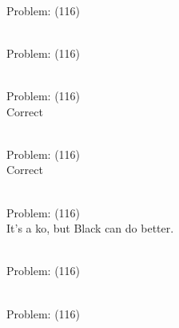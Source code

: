 \documentclass[11pt]{article}
\begin{document}
\begin{minipage}[t]{0.5\textwidth}
  {\centering
  
\\
Problem: (116)\\
  }
\end{minipage}
\begin{minipage}[t]{0.5\textwidth}
  {\centering
  
\\
Problem: (116)\\
  }
\end{minipage}
\begin{minipage}[t]{0.5\textwidth}
  {\centering
  
\\
Problem: (116)\\
Correct\\
  }
\end{minipage}
\begin{minipage}[t]{0.5\textwidth}
  {\centering
  
\\
Problem: (116)\\
Correct\\
  }
\end{minipage}
\begin{minipage}[t]{0.5\textwidth}
  {\centering
  
\\
Problem: (116)\\
It's a ko, but Black can do better.\\
  }
\end{minipage}
\begin{minipage}[t]{0.5\textwidth}
  {\centering
  
\\
Problem: (116)\\
  }
\end{minipage}
\begin{minipage}[t]{0.5\textwidth}
  {\centering
  
\\
Problem: (116)\\
  }
\end{minipage}
\end{document}
